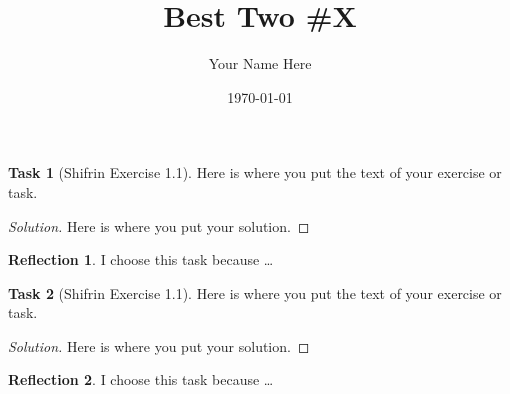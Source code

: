 \documentclass[11pt]{amsart}
\theoremstyle{definition}
\newtheorem{task}{Task}
\newtheorem*{remark}{Reflection}
\begin{document}


\title{Best Two \#X} %
\author{Your Name Here} %
\date{\today}

\maketitle

\begin{task}[Shifrin Exercise 1.1] %
Here is where you put the text of your exercise or task. %
\end{task}

\begin{proof}[Solution]

Here is where you put your solution.

\end{proof}

\begin{remark}
I choose this task because \dots %
\end{remark}


\clearpage 
\begin{task}[Shifrin Exercise 1.1] %
Here is where you put the text of your exercise or task. %
\end{task}

\begin{proof}[Solution]

Here is where you put your solution.

\end{proof}

\begin{remark}
I choose this task because \dots %
\end{remark}
\end{document}
